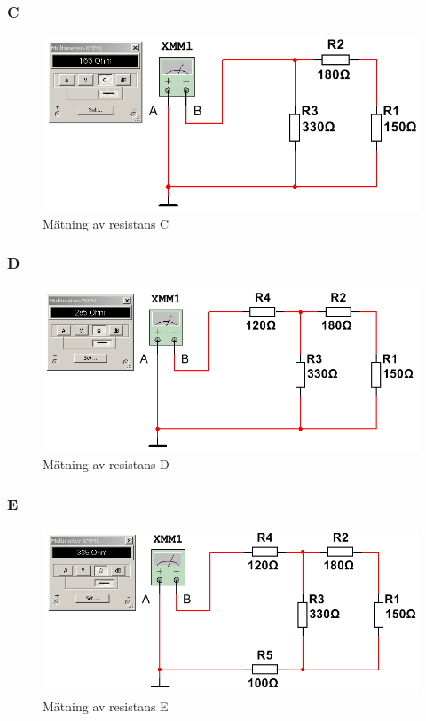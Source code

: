 \documentclass[11pt,a4paper]{article}
\begin{document}
\subsubsection{C}
\begin{figure}[htbp]
    \centering
    \includegraphics[scale=0.5]{ee466multisim/4c.png}
    \caption{Mätning av resistans C}
    \label{fig:sim-4c}
\end{figure}

\subsubsection{D}
\begin{figure}[htbp]
    \centering
    \includegraphics[scale=0.5]{ee466multisim/4d.png}
    \caption{Mätning av resistans D}
    \label{fig:sim-4d}
\end{figure}

\subsubsection{E}
\begin{figure}[htbp]
    \centering
    \includegraphics[scale=0.5]{ee466multisim/4e.png}
    \caption{Mätning av resistans E}
    \label{fig:sim-4e}
\end{figure}
\end{document}
